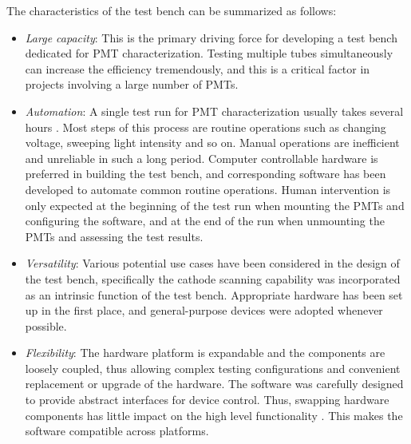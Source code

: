 \documentclass{nst}
\providecommand{\DIFadd}[1]{{\protect\color{yellow} #1}} %
\providecommand{\DIFaddbegin}{} %
\providecommand{\DIFaddend}{} %
\providecommand{\DIFdelbegin}{} %
\providecommand{\DIFdelend}{} %
\begin{document}
The characteristics of the test bench can be summarized as follows:
\begin{itemize}
	\item \textit{Large capacity}: This is the primary driving force for developing a test bench dedicated for PMT characterization.
	Testing multiple tubes simultaneously can increase the efficiency tremendously, and this is a critical factor in projects involving \DIFaddbegin \DIFadd{a }\DIFaddend large number of PMTs. 
	\item \textit{Automation}: A single test run for PMT characterization usually takes several hours\DIFdelbegin \DIFdelend \DIFaddbegin \DIFadd{. Most steps of this process are routine operations such as }\DIFaddend changing voltage, \DIFdelbegin \DIFdelend \DIFaddbegin \DIFadd{sweeping }\DIFaddend light intensity and so on.
	Manual operations are inefficient and unreliable in such a long period.
	Computer controllable hardware is preferred in building the test bench, and corresponding software has been developed to automate \DIFdelbegin \DIFdelend \DIFaddbegin \DIFadd{common routine operations.
	Human }\DIFaddend intervention is only expected at the beginning of the test run when mounting the PMTs and configuring the software, and at the end of the run when unmounting the PMTs and assessing the test results.
	\item \textit{Versatility}: Various potential use cases have been considered in the design of the test bench, specifically the cathode scanning capability \DIFdelbegin \DIFdelend \DIFaddbegin \DIFadd{was }\DIFaddend incorporated as an intrinsic function of the test bench.
	Appropriate hardware has been set up in the first place, and general-purpose devices \DIFdelbegin \DIFdelend \DIFaddbegin \DIFadd{were }\DIFaddend adopted whenever possible.
	\item \textit{Flexibility}: %
	The hardware platform is \DIFdelbegin \DIFdelend \DIFaddbegin \DIFadd{expandable }\DIFaddend and the components are loosely coupled, thus allowing complex testing configurations and convenient replacement or upgrade of the hardware.
	The software \DIFdelbegin \DIFdelend \DIFaddbegin \DIFadd{was carefully designed to provide abstract interfaces for device control. Thus, swapping hardware components has little impact on the }\DIFaddend high level functionality\DIFdelbegin \DIFdelend \DIFaddbegin \DIFadd{. This makes the software compatible across platforms.
}\DIFaddend \end{itemize}
\end{document}
